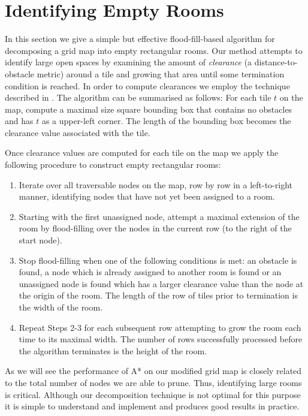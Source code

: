 \section{Identifying Empty Rooms}
\label{empty rooms}
In this section we give a simple but effective flood-fill-based algorithm for decomposing a 
grid map into empty rectangular rooms.
Our method attempts to identify large open spaces by examining the amount of \emph{clearance}
(a distance-to-obstacle metric) around a tile and growing that area until some termination 
condition is reached.
In order to compute clearances we employ the technique described in \cite{harabor08}.
The algorithm can be summarised as follows:
For each tile $t$ on the map, compute a maximal size square bounding box that contains no obstacles
and has $t$ as a upper-left corner.
The length of the bounding box becomes the clearance value associated with the tile.
%
\par
Once clearance values are computed for each tile on the map we apply the following
procedure to construct empty rectangular rooms:


\begin{enumerate}
\item{Iterate over all traversable nodes on the map, row by row in a
left-to-right manner, identifying nodes that have not yet 
been assigned to a room.}
\item{Starting with the first unassigned node, attempt a maximal extension of the room
by flood-filling over the nodes in the current row (to the right of the start node).}
\item{Stop flood-filling when one of the following conditions is met: an obstacle is found,
a node which is already assigned to another room is found or an unassigned
node is found which has a larger clearance value than the node at the origin of the room.
The length of the row of tiles prior to termination is the width of the room.}
\item{Repeat Steps 2-3 for each subsequent row attempting to grow the room
each time to its maximal width.
The number of rows successfully processed before the algorithm terminates is the height of the room.}
\end{enumerate}


As we will see the performance of A* on our modified grid map is closely related to the total 
number of nodes we are able to prune.
Thus, identifying large rooms is critical.
Although our decomposition technique is not optimal for this purpose it is simple
to understand and implement and produces good results in practice.
